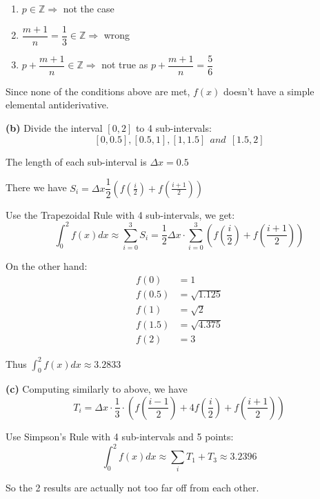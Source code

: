 \begin{enumerate}[label=(\arabic*)]
    \item $p \in \mathbb{Z} \Rightarrow$ not the case
    \item $\dfrac{m+1}{n} = \dfrac{1}{3} \in \mathbb{Z} \Rightarrow$ wrong
    \item $p + \dfrac{m+1}{n} \in \mathbb{Z} \Rightarrow$ not true as $p + \dfrac{m+1}{n} = \dfrac{5}{6}$
\end{enumerate}

Since none of the conditions above are met, $f(x)$ doesn't have a simple elemental antiderivative.

\textbf{(b)} Divide the interval $[0, 2]$ to 4 sub-intervals:
\[ [0, 0.5], [0.5, 1], [1, 1.5]\ \ and \ \ [1.5, 2] \]

The length of each sub-interval is $\Delta x = 0.5$

There we have $S_i = \Delta x \dfrac{1}{2}\left(f\left(\frac{i}{2}\right) + f\left(\frac{i+1}{2}\right)\right)$

Use the Trapezoidal Rule with 4 sub-intervals, we get:
\[ \int_0^2 f(x) dx \approx \sum_{i=0}^{3} S_i = \frac{1}{2} \Delta x \cdot \sum_{i=0}^{3} \left(f\left(\frac{i}{2}\right) + f\left(\frac{i+1}{2}\right)\right) \]

On the other hand: 
\begin{align*}
f(0) &= 1 \\
f(0.5) &= \sqrt{1.125} \\
f(1) &= \sqrt{2} \\
f(1.5) &= \sqrt{4.375} \\
f(2) &= 3
\end{align*}

Thus $\int_0^2 f(x) dx \approx 3.2833$

\textbf{(c)} Computing similarly to above, we have
\[ T_i = \Delta x \cdot \frac{1}{3} \cdot \left(f\left(\frac{i-1}{2}\right) + 4f\left(\frac{i}{2}\right) + f\left(\frac{i+1}{2}\right)\right) \]

Use Simpson's Rule with 4 sub-intervals and 5 points:
\[ \int_0^2 f(x) dx \approx \sum_{i} T_1 + T_3 \approx 3.2396 \]

So the 2 results are actually not too far off from each other.

\begin{center}
\end{center}

